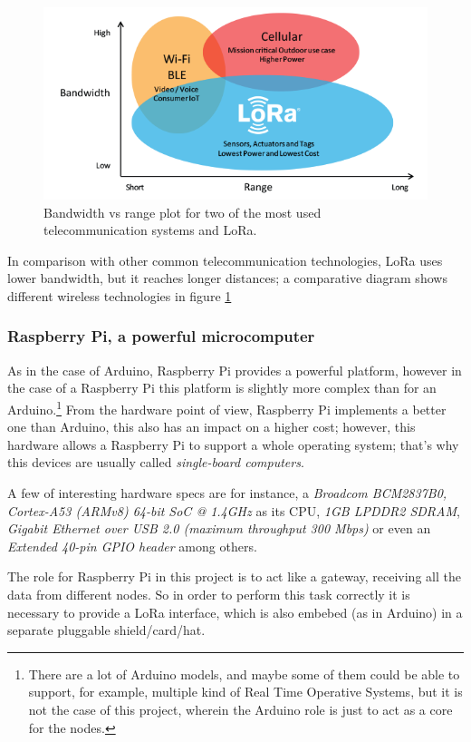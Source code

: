 \documentclass[11pt,a4paper,dvipsnames,twoside]{article}
\begin{document}
\begin{figure}[htp]
  \centering
  \includegraphics[width=.9\textwidth]{../pictures/LoRa_Why_Range.png}
  \caption{Bandwidth vs range plot for two of the most used telecommunication systems and LoRa.}
  \label{fig:LoraComparison}
\end{figure}

In comparison with other common telecommunication technologies, LoRa uses lower bandwidth, but it reaches longer distances; a comparative diagram shows different wireless technologies in figure \ref{fig:LoraComparison}
 
\subsubsection{Raspberry Pi, a powerful microcomputer}
As in the case of Arduino, Raspberry Pi provides a powerful platform, however in the case of a Raspberry Pi this platform is slightly more complex than for an Arduino.\footnote{There are a lot of Arduino models, and maybe some of them could be able to support, for example, multiple kind of Real Time Operative Systems, but it is not the case of this project, wherein the Arduino role is just to act as a core for the nodes.} From the hardware point of view, Raspberry Pi implements a better one than Arduino, this also has an impact on a higher cost; however, this hardware allows a Raspberry Pi to support a whole operating system; that's why this devices are usually called \textit{single-board computers}.

A few of interesting hardware specs are for instance, a \textit{Broadcom BCM2837B0, Cortex-A53 (ARMv8) 64-bit SoC @ 1.4GHz} as its CPU, \textit{1GB LPDDR2 SDRAM}, \textit{Gigabit Ethernet over USB 2.0 (maximum throughput 300 Mbps)} or even an \textit{Extended 40-pin GPIO header} among others.\cite{RPiSpecs}

The role for Raspberry Pi in this project is to act like a gateway, receiving all the data from different nodes. So in order to perform this task correctly it is necessary to provide a LoRa interface, which is also embebed (as in Arduino) in a separate pluggable shield/card/hat.
\end{document}
